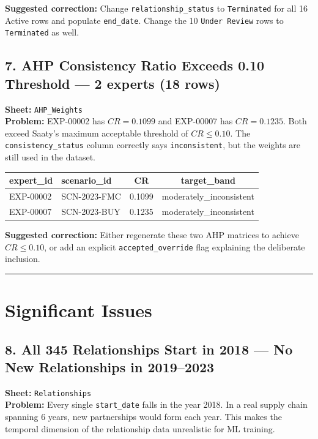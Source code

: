 \documentclass[11pt]{article}
\begin{document}
\medskip
\noindent\textbf{Suggested correction:} Change \texttt{relationship\_status} to \texttt{Terminated} for all 16 Active rows and populate \texttt{end\_date}. Change the 10 \texttt{Under Review} rows to \texttt{Terminated} as well.

\bigskip

\subsection*{7. AHP Consistency Ratio Exceeds 0.10 Threshold --- 2 experts (18 rows)}
\textbf{Sheet:} \texttt{AHP\_Weights}\\
\textbf{Problem:} EXP-00002 has $CR = 0.1099$ and EXP-00007 has $CR = 0.1235$. Both exceed Saaty's maximum acceptable threshold of $CR \leq 0.10$. The \texttt{consistency\_status} column correctly says \texttt{inconsistent}, but the weights are still used in the dataset.

\begin{center}
\begin{tabular}{llcc}
\toprule
\textbf{expert\_id} & \textbf{scenario\_id} & \textbf{CR} & \textbf{target\_band} \\
\midrule
EXP-00002 & SCN-2023-FMC & \textcolor{critred}{0.1099} & moderately\_inconsistent \\
EXP-00007 & SCN-2023-BUY & \textcolor{critred}{0.1235} & moderately\_inconsistent \\
\bottomrule
\end{tabular}
\end{center}

\noindent\textbf{Suggested correction:} Either regenerate these two AHP matrices to achieve $CR \leq 0.10$, or add an explicit \texttt{accepted\_override} flag explaining the deliberate inclusion.

\bigskip
\hrule
\bigskip

\section*{\textcolor{warnyellow}{Significant Issues}}

\subsection*{8. All 345 Relationships Start in 2018 --- No New Relationships in 2019--2023}
\textbf{Sheet:} \texttt{Relationships}\\
\textbf{Problem:} Every single \texttt{start\_date} falls in the year 2018. In a real supply chain spanning 6 years, new partnerships would form each year. This makes the temporal dimension of the relationship data unrealistic for ML training.
\end{document}
